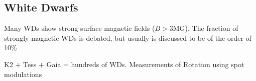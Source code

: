 {\color{red} \subsection{White Dwarfs}}
Many WDs show strong surface magnetic fields ($B>$3MG). The fraction of strongly magnetic WDs is debated, but usually is discussed to be of the order of 10\% 

K2 + Tess + Gaia = hundreds of WDs. Measurements of Rotation using spot modulations